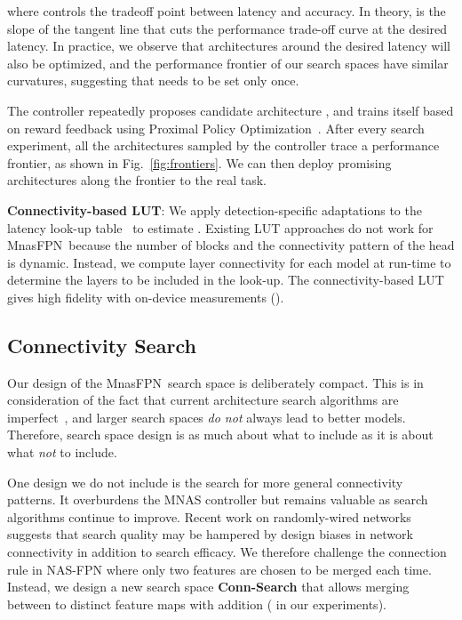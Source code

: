 \documentclass[10pt,twocolumn,letterpaper]{article}
\def\Mnasfpn{MnasFPN~}
\begin{document}
where  controls the tradeoff point between latency and accuracy. In theory,  is the slope of the tangent line that cuts the performance trade-off curve at the desired latency. In practice, we observe that architectures around the desired latency will also be optimized, and the performance frontier of our search spaces have similar curvatures, suggesting that  needs to be set only once.


The controller repeatedly proposes candidate architecture , and trains itself based on reward feedback  using Proximal Policy Optimization~\cite{schulman2017proximal}. After every search experiment, all the  architectures sampled by the controller trace a performance frontier, as shown in Fig.~\ref{fig:frontiers}. We can then deploy promising architectures along the frontier to the real task.

{\bf Connectivity-based LUT}: We apply detection-specific adaptations to the latency look-up table~\cite{yang2018netadapt, tan2019mnasnet} to estimate . Existing LUT approaches do not work for \Mnasfpn because the number of blocks and the connectivity pattern of the head is dynamic. Instead, we compute layer connectivity for each model at run-time to determine the layers to be included in the look-up. The connectivity-based LUT gives high fidelity with on-device measurements ().


\subsection{Connectivity Search}
\label{sec:conn}
Our design of the \Mnasfpn search space is deliberately compact. This is in consideration of the fact that current architecture search algorithms are imperfect~\cite{li2019random}, and larger search spaces {\it do not} always lead to better models. Therefore, search space design is as much about what to include as it is about what {\it not} to include. 

One design we do not include is the search for more general connectivity patterns. It overburdens the MNAS controller but remains valuable as search algorithms continue to improve. Recent work on randomly-wired networks~\cite{xie2019exploring} suggests that search quality may be hampered by design biases in network connectivity in addition to search efficacy. We therefore challenge the connection rule in NAS-FPN where only two features are chosen to be merged each time. Instead, we design a new search space {\bf Conn-Search} that allows merging between  to  distinct feature maps with addition ( in our experiments). 
\end{document}

